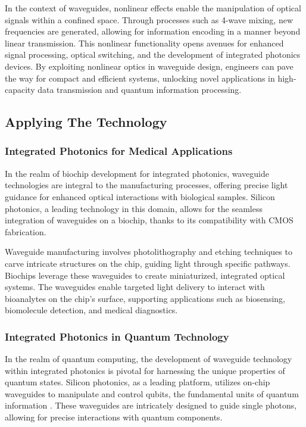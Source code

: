 \documentclass[10pt]{article}
\begin{document}
In the context of waveguides, nonlinear effects enable the manipulation of
optical signals within a confined space. Through processes such as 4-wave mixing,
new frequencies are generated, allowing for information encoding in a manner beyond
linear transmission. This nonlinear functionality opens avenues for enhanced signal
processing, optical switching, and the development of integrated photonics devices.
By exploiting nonlinear optics in waveguide design, engineers can pave the way for
compact and efficient systems, unlocking novel applications in high-capacity data
transmission and quantum information processing.


\subsection{Applying The Technology}
\subsubsection{Integrated Photonics for Medical Applications}
In the realm of biochip development for integrated photonics, waveguide technologies are integral to the manufacturing processes, offering precise light guidance for enhanced optical interactions with biological samples. Silicon photonics, a leading technology in this domain, allows for the seamless integration of waveguides on a biochip, thanks to its compatibility with CMOS fabrication.


Waveguide manufacturing involves photolithography and etching techniques to carve intricate structures on the chip, guiding light through specific pathways. Biochips leverage these waveguides to create miniaturized, integrated optical systems. The waveguides enable targeted light delivery to interact with bioanalytes on the chip's surface, supporting applications such as biosensing, biomolecule detection, and medical diagnostics.
\subsubsection{Integrated Photonics in Quantum Technology}
In the realm of quantum computing, the development of waveguide technology within integrated photonics 
is pivotal for harnessing the unique properties of quantum states. Silicon photonics, 
as a leading platform, utilizes on-chip waveguides to manipulate and control qubits, the fundamental units of quantum information \cite{ref03}.
These waveguides are intricately designed to guide single photons, allowing for precise interactions with quantum components.
\end{document}
